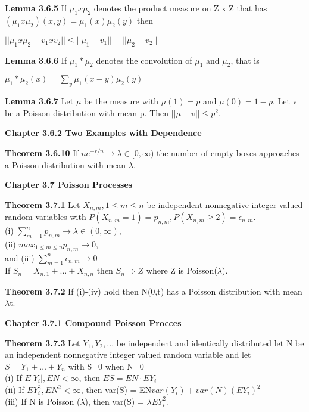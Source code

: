 \documentclass{article}
\begin{document}
\textbf {Lemma 3.6.5} If $\mu_1 x \mu_2$ denotes the product measure on Z x Z that has $(\mu_1 x \mu_2)(x,y) = \mu_1(x) \mu_2(y)$ then
\begin{center}
$||\mu_1 x \mu_2 - v_1 x v_2|| \leq ||\mu_1 - v_1|| + ||\mu_2 - v_2||$
\end{center}

\textbf {Lemma 3.6.6} If $\mu_1 * \mu_2$ denotes the convolution of $\mu_1$ and $\mu_2$, that is
\begin{center}
$\mu_1 * \mu_2(x) = \sum_{y} \mu_1 (x-y) \mu_2 (y)$
\end{center}

\textbf {Lemma 3.6.7} Let $\mu$ be the measure with $\mu(1) = p$ and $\mu(0) = 1 - p$. Let v be a Poisson distribution with mean p. Then $||\mu - v|| \leq p^2$.

\textbf {Chapter 3.6.2 Two Examples with Dependence}

\textbf {Theorem 3.6.10} If $ne^{-r/n} \rightarrow \lambda \in [0, \infty)$ the number of empty boxes approaches a Poisson distribution with mean $\lambda$.

\textbf {Chapter 3.7 Poisson Processes}

\textbf {Theorem 3.7.1} Let $X_{n,m}, 1 \leq m \leq n$ be independent nonnegative integer valued random variables with $P(X_{n,m} = 1) = p_{n,m}, P(X_{n,m} \geq 2) = \epsilon_{n,m}$. \\
(i) $\sum_{m=1}^n p_{n,m} \rightarrow \lambda \in (0, \infty)$, \\
(ii) $max_{1 \leq m \leq n} p_{n,m} \rightarrow 0,$ \\
and (iii) $\sum_{m=1}^n \epsilon_{n,m} \rightarrow 0$ \\
If $S_n = X_{n,1} + \dots + X_{n,n}$ then $S_n \Rightarrow Z$ where Z is Poisson($\lambda$).

\textbf {Theorem 3.7.2} If (i)-(iv) hold then N(0,t) has a Poisson distribution with mean $\lambda$t.

\textbf {Chapter 3.7.1 Compound Poisson Procces}

\textbf {Theorem 3.7.3} Let $Y_1, Y_2 ,...$ be independent and identically distributed let N be an independent nonnegative integer valued random variable and let $S = Y_1 + \dots + Y_n$ with S=0 when N=0 \\
(i) If $E|Y_i|, EN < \infty$, then $ES = EN \cdot EY_i$ \\
(ii) If $EY_i^2, EN^2 < \infty$, then var(S) = EN$var(Y_i) + var(N)(EY_i)^2$ \\
(iii) If N is Poisson ($\lambda$), then var(S) = $\lambda EY_i^2$.
\end{document}
